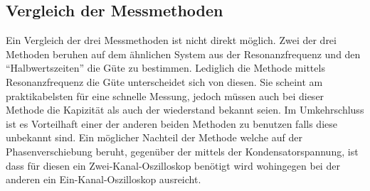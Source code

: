 \subsection{Vergleich der Messmethoden}
Ein Vergleich der drei Messmethoden ist nicht direkt möglich. Zwei der drei Methoden beruhen auf dem ähnlichen System aus der Resonanzfrequenz und den ``Halbwertszeiten'' die Güte zu bestimmen. Lediglich die Methode mittels Resonanzfrequenz die Güte unterscheidet sich von diesen. Sie scheint am praktikabelsten für eine schnelle Messung, jedoch müssen auch bei dieser Methode die Kapizität als auch der wiederstand bekannt seien. Im Umkehrschluss ist es Vorteilhaft einer der anderen beiden Methoden zu benutzen falls diese unbekannt sind. Ein möglicher Nachteil der Methode welche auf der Phasenverschiebung beruht, gegenüber der mittels der Kondensatorspannung, ist dass für diesen ein Zwei-Kanal-Oszilloskop benötigt wird wohingegen bei der anderen ein Ein-Kanal-Oszilloskop ausreicht.
